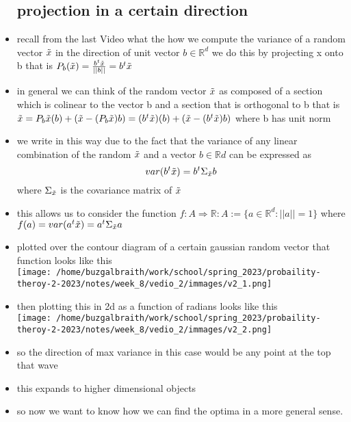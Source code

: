 \documentclass{article}
\begin{document}
\begin{itemize}
\subsection*{projection in a certain direction}
\item recall from the last Video what the how we compute the variance of a random vector $\Tilde{x}$ in the direction of unit vector $b\in \mathbb{R}^{d}$ we do this by projecting x onto b that is $P_{b}(\Tilde{x})=\frac{b^{t}\Tilde{x}}{||b||}=b^{t}\Tilde{x}$
\item in general we can think of the random vector $\Tilde{x}$ as composed of a section which is colinear to the vector b and a section that is orthogonal to b that is $\Tilde{x}=P_{b}\Tilde{x}(b)+(\Tilde{x}-(P_{b}\Tilde{x})b)=(b^{t}\Tilde{x})(b)+(\Tilde{x}-(b^{t}\Tilde{x})b)$ where b has unit norm 
\item we write in this way due to the fact that the variance of any linear combination of the random $\Tilde{x}$ and a vector $b\in \mathbb{R}{d}$ can be expressed as $$var(b^{t}\Tilde{x})=b^t\Sigma_{\Tilde{x}}b$$ where $\Sigma_{\Tilde{x}}$ is the covariance matrix of $\Tilde{x}$
\item this allows us to consider the function $f:A\Rightarrow\mathbb{R}: A:=\{a\in \mathbb{R}^{d} : ||a||=1\}$ where
 $f(a)=var(a^t\Tilde{x})=a^{t}\Sigma_{\Tilde{x}}a$
\item plotted over the contour diagram of a certain gaussian random vector that function looks
 like this \\ \texttt{[image: /home/buzgalbraith/work/school/spring\_2023/probaility-theroy-2-2023/notes/week\_8/vedio\_2/immages/v2\_1.png]}
\item then plotting this in 2d as a function of radians looks like this 
 \\ \texttt{[image: /home/buzgalbraith/work/school/spring\_2023/probaility-theroy-2-2023/notes/week\_8/vedio\_2/immages/v2\_2.png]}
 \item so the direction of max variance in this case would be any point at the top that wave
 \item this expands to higher dimensional objects
 \item so now we want to know how we can find the optima in a more general sense. 

\end{itemize}
\end{document}
